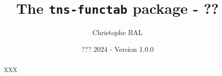 \title{The \texttt{tns-functab} package - ??}
\author{Christophe BAL}
\date{??? 2024 - Version 1.0.0}

\maketitle

\begin{abstract}
XXX
\end{abstract}
